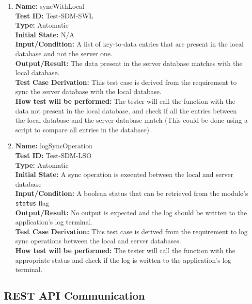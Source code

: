 \documentclass[12pt, titlepage]{article}
\begin{document}
\begin{enumerate}
  \item \textbf{Name:} syncWithLocal \label{itm:Test-SDM-SWL} \\
        \textbf{Test ID:} Test-SDM-SWL \\
        \textbf{Type:} Automatic \\
        \textbf{Initial State:} N/A \\
        \textbf{Input/Condition:} A list of key-to-data entries that are present in the local database and not the server one. \\
        \textbf{Output/Result:} The data present in the server database matches with the local database. \\
        \textbf{Test Case Derivation:} This test case is derived from the requirement to sync the server database with the local database. \\
        \textbf{How test will be performed:} The tester will call the function with the data not present in the local database, and check if all the entries between the local database and the server database match (This could be done using a script to compare all entries in the database). \\

  \item \textbf{Name:} logSyncOperation \label{itm:Test-SDM-LSO} \\
        \textbf{Test ID:} Test-SDM-LSO \\
        \textbf{Type:} Automatic \\
        \textbf{Initial State:} A sync operation is executed between the local and server database \\
        \textbf{Input/Condition:} A boolean status that can be retrieved from the module's \texttt{status} flag \\
        \textbf{Output/Result:} No output is expected and the log should be written to the application's log terminal. \\
        \textbf{Test Case Derivation:} This test case is derived from the requirement to log sync operations between the local and server databases. \\
        \textbf{How test will be performed:} The tester will call the function with the appropriate status and check if the log is written to the application's log terminal. \\

\end{enumerate}

\subsection{REST API Communication}
\end{document}
